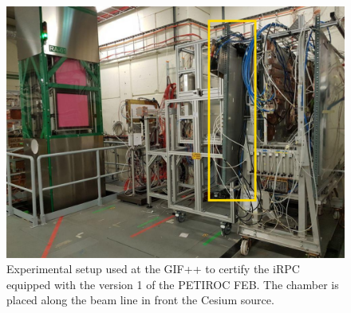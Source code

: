 \begingroup\setlength{\intextsep}{5pt}\setlength{\columnsep}{15pt}
	
	\begin{figure}
		\centering
		\includegraphics[width = 0.9\linewidth]{fig/chapt6/iRPC-RPCROC-GIFpp.png}
		\caption{\label{fig:RPCROCv1_GIFpp} Experimental setup used at the GIF++ to certify the iRPC equipped with the version 1 of the PETIROC FEB. The chamber is placed along the beam line in front the Cesium source.}
    \end{figure}
    
